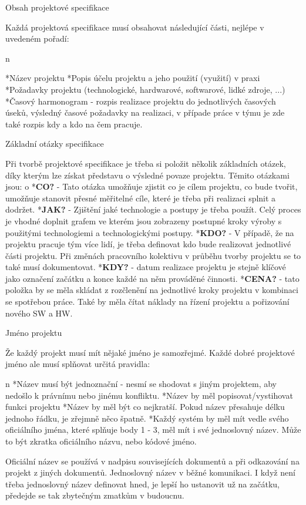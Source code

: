 \sec Obsah projektové specifikace

Každá projektová specifikace musí obsahovat následující části, nejlépe v uvedeném pořadí:

\begitems\style n

*Název projektu
*Popis účelu projektu a jeho použití (využití) v praxi
*Požadavky projektu (technologické, hardwarové, softwarové, lidké zdroje, ...)
*Časový harmonogram - rozpis realizace projektu do jednotlivých časových úseků, výsledný časové požadavky na realizaci, v případe práce v týmu je zde také rozpis kdy a kdo na čem pracuje.
\enditems

\sec Základní otázky specifikace

Při tvorbě projektové specifikace je třeba si položit několik základních otázek, díky kterým lze získat představu o výsledné povaze projektu. Těmito otázkami jsou:
\begitems\style o
*{\bf CO?} - Tato otázka umožňuje zjistit co je cílem projektu, co bude tvořit, umožňuje stanovit přesné měřitelné cíle, které je třeba při realizaci splnit a dodržet.
*{\bf JAK?} -  Zjištění jaké technologie a postupy je třeba použít. Celý proces je vhodné doplnit grafem ve kterém jsou zobrazeny postupné kroky výroby s použitými technologiemi a technologickými postupy.
*{\bf KDO?} - V případě, že na projektu pracuje tým více lidí, je třeba definovat kdo bude realizovat jednotlivé části projektu. Při změnách pracovního kolektivu v průběhu tvorby projektu se to také musí dokumentovat.
*{\bf KDY?} - datum realizace projektu je stejně klíčové jako označení začátku a konce každé na něm prováděné činnosti.
*{\bf CENA?} - tato položka by se měla skládat z rozčlenění na jednotlivé kroky projektu v kombinaci se spotřebou práce. Také by měla čítat náklady na řízení projektu a pořizování nového SW a HW.
\enditems

\sec Jméno projektu

Že každý projekt musí mít nějaké jméno je samozřejmé. Každé dobré projektové jméno ale musí splňovat určitá pravidla:

\begitems\style n
*Název musí být jednoznační - nesmí se shodovat s jiným projektem, aby nedošlo k právnímu nebo jinému konfliktu.
*Název by měl popisovat/vystihovat funkci projektu
*Název by měl být co nejkratší. Pokud název přesahuje délku jednoho řádku, je zřejmně něco špatně.
*Každý systém by měl mít vedle svého oficiálního jména, které splňuje body 1 - 3, měl mít i své jednoslovný název. Může to být zkratka oficiálního názvu, nebo kódové jméno.
\enditems

Oficiální název se používá v nadpisu souvisejících dokumentů a při odkazování na projekt z jiných dokumentů. Jednoslovný název v běžné komunikaci. I když není třeba jednoslovný název definovat hned, je lepší ho ustanovit už na začátku, předejde se tak zbytečným zmatkům v budoucnu. 

